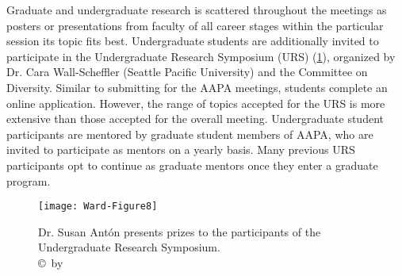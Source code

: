 Graduate  and undergraduate research is scattered throughout the meetings as posters or presentations
from faculty of all career stages within the particular session its topic fits best. Undergraduate students are additionally invited
to participate in the Undergraduate Research Symposium (URS) (\cref{fig:Ward-Figure8}), organized by Dr. Cara Wall-Scheffler
(Seattle Pacific University) and the Committee on Diversity.  
Similar to submitting for the AAPA meetings, students complete an online application.
However, the range of topics accepted for the URS is more extensive than those accepted for the overall meeting.
Undergraduate student participants are mentored by graduate student members of AAPA,
who are invited to participate as mentors on a yearly basis.
Many previous URS participants opt to continue as graduate mentors once they enter a graduate program.

	\begin{figure}[!htb] %
		\centering
		\texttt{[image: Ward-Figure8]}
		\caption{Dr. Susan Antón presents prizes to the participants of the Undergraduate Research Symposium.
				{\normalfont\scriptsize \\ \copyright\ by \authortwo}}
		\label{fig:Ward-Figure8}
	\end{figure}

